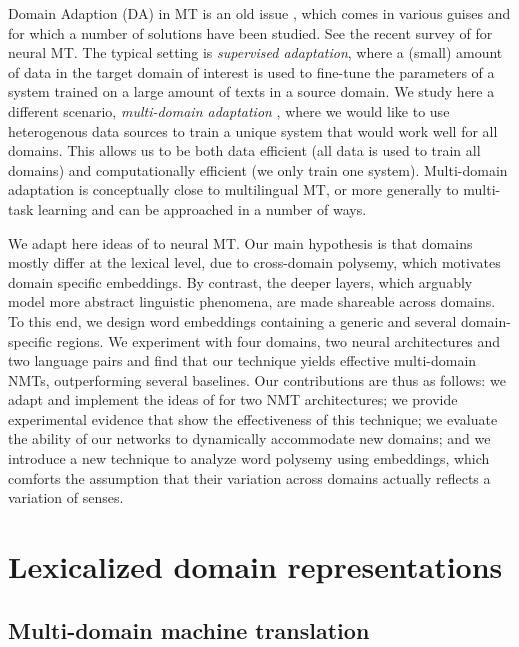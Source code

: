 Domain Adaption (DA) in MT is an old issue \cite{Foster07mixture,Axelrod11domain}, which comes in various guises and for which a number of solutions have been studied. 
See the recent survey of \cite{Chu18asurvey} for neural MT. 
The typical setting is \emph{supervised adaptation}, where a (small) amount of data in the target domain of interest is used to fine-tune the parameters of a system trained on a large amount of texts in a source domain. 
We study here a different scenario, \emph{multi-domain adaptation} \cite{Sennrich13multidomain,Farajian17multidomain}, where we would like to use heterogenous data sources to train a unique system that would work well for all domains. 
This allows us to be both data efficient (all data is used to train all domains) and computationally efficient (we only train one system).
Multi-domain adaptation is conceptually close to multilingual MT, or more generally to multi-task learning \cite{Caruana97multitask} and can be approached in a number of ways. 

We adapt here ideas of \cite{Daume07frustratingly} to neural MT.
Our main hypothesis is that domains mostly differ at the lexical level, due to cross-domain polysemy, which motivates domain specific embeddings. 
By contrast, the deeper layers, which arguably model more abstract linguistic phenomena, are made shareable across domains. 
To this end, we design word embeddings containing a generic and several domain-specific regions. 
We experiment with four domains, two neural architectures and two language pairs and find that our technique yields effective multi-domain NMTs, outperforming several baselines. 
Our contributions are thus as follows:
we adapt and implement the ideas of \cite{Daume07frustratingly} for two NMT architectures;
we provide experimental evidence that show the effectiveness of this technique;
we evaluate the ability of our networks to dynamically accommodate new domains;
and we introduce a new technique to analyze word polysemy using embeddings, which comforts the assumption that their variation across domains actually reflects a variation of senses.

\section{Lexicalized domain representations\label{sec:lexicalized_embeddings}}

\subsection{Multi-domain machine translation \label{ssec:statement}}

